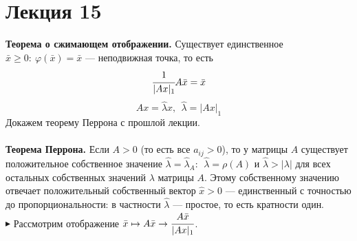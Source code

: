 \documentclass[12pt]{article}
\theoremstyle{definition}
\numberwithin{equation}{section}
\begin{document}
\section *{Лекция 15}
\noindent\textbf{Теорема о сжимающем отображении.} Существует единственное $\bar x\geqslant 0:~\varphi(\bar x)=\bar x$ --- неподвижная точка, то есть $$\cfrac{1}{|Ax|_1}A\bar x=\bar x$$
$$Ax=\hat \lambda x,~~\hat \lambda=|Ax|_1$$
Докажем теорему Перрона с прошлой лекции.\\ \\
\textbf{Теорема Перрона.} Если $A>0$ (то есть все $a_{ij}>0$), то у матрицы $A$ существует положительное собственное значение $\hat \lambda =\hat \lambda_A:~~\hat \lambda =\rho(A)$ и $\hat \lambda>|\lambda|$ для всех остальных собственных значений $\lambda$ матрицы $A$. Этому собственному значению отвечает положительный собственный вектор $\hat x>0$ --- единственный с точностью до пропорциональности: в частности $\hat \lambda$ --- простое, то есть кратности один.\\
$\blacktriangleright$ Рассмотрим отображение $\bar x \mapsto A \bar x \to \cfrac{A\bar x}{|Ax|_1}$.\\
\end{document}
